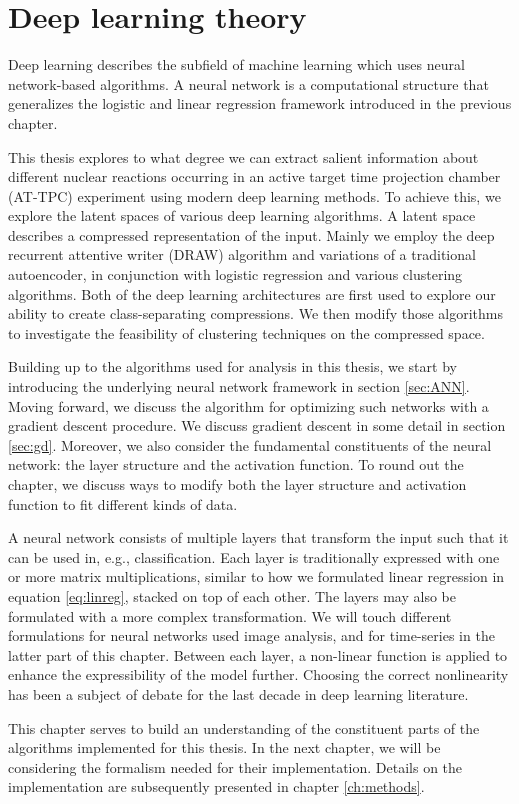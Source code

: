 \chapter{Deep learning theory}\label{ch:ml}

Deep learning describes the subfield of machine learning which uses neural network-based algorithms. A neural network is a computational structure that generalizes the logistic and linear regression framework introduced in the previous chapter.

This thesis explores to what degree we can extract salient information about different nuclear reactions occurring in an active target time projection chamber (AT-TPC) experiment using modern deep learning methods. To achieve this, we explore the latent spaces of various deep learning algorithms. A latent space describes a compressed representation of the input. Mainly we employ the deep recurrent attentive writer (DRAW) algorithm \cite{Gregor2015} and variations of a traditional autoencoder, in conjunction with logistic regression and various clustering algorithms. Both of the deep learning architectures are first used to explore our ability to create class-separating compressions. We then modify those algorithms to investigate the feasibility of clustering techniques on the compressed space. 

Building up to the algorithms used for analysis in this thesis, we start by introducing the underlying neural network framework in section \ref{sec:ANN}. Moving forward, we discuss the algorithm for optimizing such networks with a gradient descent procedure. We discuss gradient descent in some detail in section \ref{sec:gd}. Moreover, we also consider the fundamental constituents of the neural network: the layer structure and the activation function. To round out the chapter, we discuss ways to modify both the layer structure and activation function to fit different kinds of data.

A neural network consists of multiple layers that transform the input such that it can be used in, e.g., classification. Each layer is traditionally expressed with one or more matrix multiplications, similar to how we formulated linear regression in equation \ref{eq:linreg}, stacked on top of each other. The layers may also be formulated with a more complex transformation. We will touch different formulations for neural networks used image analysis, and for time-series in the latter part of this chapter.  Between each layer, a non-linear function is applied to enhance the expressibility of the model further. Choosing the correct nonlinearity has been a subject of debate for the last decade in deep learning literature.

This chapter serves to build an understanding of the constituent parts of the algorithms implemented for this thesis. In the next chapter, we will be considering the formalism needed for their implementation. Details on the implementation are subsequently presented in chapter \ref{ch:methods}.